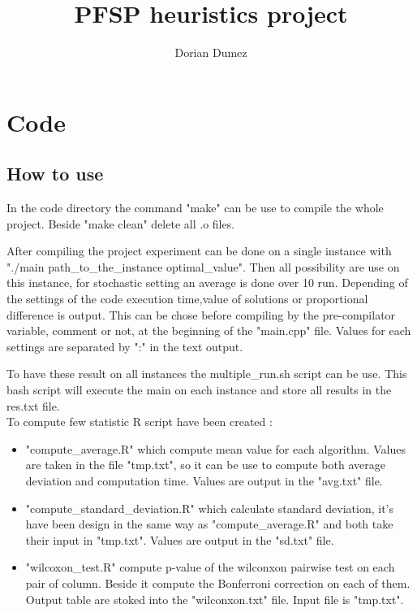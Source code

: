 \documentclass[12pt,a4paper]{article}
\title{PFSP heuristics project}
\author{Dorian Dumez}
\begin{document}
\maketitle

\section{Code}

\subsection{How to use}

In the code directory the command "make" can be use to compile the whole project. Beside "make clean" delete all .o files.

After compiling the project experiment can be done on a single instance with "./main path\_to\_the\_instance optimal\_value". Then all possibility are use on this instance, for stochastic setting an average is done over 10 run. Depending of the settings of the code execution time,value of solutions or proportional difference is output. This can be chose before compiling by the pre-compilator variable, comment or not, at the beginning of the "main.cpp" file. Values for each settings are separated by ":" in the text output.

To have these result on all instances the multiple\_run.sh script can be use. This bash script will execute the main on each instance and store all results in the res.txt file.\\

To compute few statistic R script have been created :
\begin{itemize}
\item
"compute\_average.R" which compute mean value for each algorithm. Values are taken in the file "tmp.txt", so it can be use to compute both average deviation and computation time. Values are output in the "avg.txt" file.
\item
"compute\_standard\_deviation.R" which calculate standard deviation, it's have been design in the same way as "compute\_average.R" and both take their input in "tmp.txt". Values are output in the "sd.txt" file.
\item
"wilcoxon\_test.R" compute p-value of the wilconxon pairwise test on each pair of column. Beside it compute the Bonferroni correction on each of them. Output table are stoked into the "wilconxon.txt" file. Input file is "tmp.txt".
\end{itemize}
\end{document}
